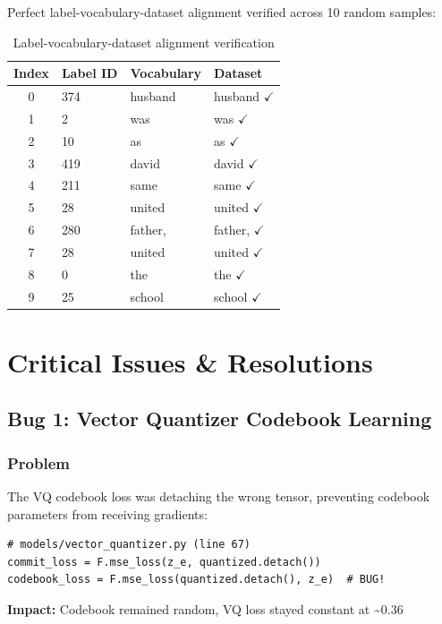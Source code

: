 \documentclass[12pt,a4paper]{article}
\begin{document}
Perfect label-vocabulary-dataset alignment verified across 10 random samples:

\begin{table}[H]
\centering
\small
\begin{tabular}{clll}
\toprule
\textbf{Index} & \textbf{Label ID} & \textbf{Vocabulary} & \textbf{Dataset} \\
\midrule
0 & 374 & husband & husband $\checkmark$ \\
1 & 2 & was & was $\checkmark$ \\
2 & 10 & as & as $\checkmark$ \\
3 & 419 & david & david $\checkmark$ \\
4 & 211 & same & same $\checkmark$ \\
5 & 28 & united & united $\checkmark$ \\
6 & 280 & father, & father, $\checkmark$ \\
7 & 28 & united & united $\checkmark$ \\
8 & 0 & the & the $\checkmark$ \\
9 & 25 & school & school $\checkmark$ \\
\bottomrule
\end{tabular}
\caption{Label-vocabulary-dataset alignment verification}
\end{table}

\section{Critical Issues \& Resolutions}

\subsection{Bug 1: Vector Quantizer Codebook Learning}

\subsubsection{Problem}
The VQ codebook loss was detaching the wrong tensor, preventing codebook parameters from receiving gradients:

\begin{lstlisting}[caption=Original Buggy Code]
# models/vector_quantizer.py (line 67)
commit_loss = F.mse_loss(z_e, quantized.detach())
codebook_loss = F.mse_loss(quantized.detach(), z_e)  # BUG!
\end{lstlisting}

\textbf{Impact:} Codebook remained random, VQ loss stayed constant at \textasciitilde0.36
\end{document}
